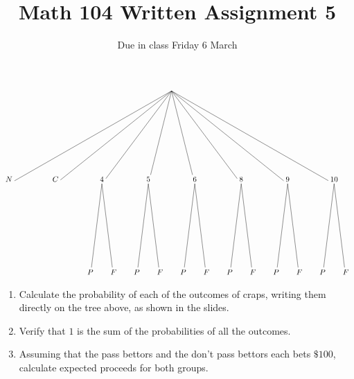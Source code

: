 \documentclass[12pt]{article}
\author{}\date{Due in class Friday 6 March}
\title{Math 104 Written Assignment 5}\author{}
\begin{document}
\maketitle
\thispagestyle{empty}
\[\begin{xy}<.85in,0cm>:
(4.5,0)="0"; (1,-2)="N"; (2,-2)="C"; (3,-2)="4";
(4,-2)="5"; (5,-2)="6"; (6,-2)="8"; (7,-2)="9"; (8,-2)="10";
"0";"N"*+!D{N}**\dir{-};
"0";"C"*+!D{C}**\dir{-};
"0";"4"*+!D{4}**\dir{-};
"0";"5"*+!D{5}**\dir{-};
"0";"6"*+!D{6}**\dir{-};
"0";"8"*+!D{8}**\dir{-};
"0";"9"*+!D{9}**\dir{-};
"0";"10"*+!D{10}**\dir{-};
"4";(2.75,-4)*+!D{P}**\dir{-};
"4";(3.25,-4)*+!D{F}**\dir{-};
"5";(3.75,-4)*+!D{P}**\dir{-};
"5";(4.25,-4)*+!D{F}**\dir{-};
"6";(4.75,-4)*+!D{P}**\dir{-};
"6";(5.25,-4)*+!D{F}**\dir{-};
"8";(5.75,-4)*+!D{P}**\dir{-};
"8";(6.25,-4)*+!D{F}**\dir{-};
"9";(6.75,-4)*+!D{P}**\dir{-};
"9";(7.25,-4)*+!D{F}**\dir{-};
"10";(7.75,-4)*+!D{P}**\dir{-};
"10";(8.25,-4)*+!D{F}**\dir{-};
\end{xy}\]

\bigskip
\begin{enumerate}
\item Calculate the probability of each of the outcomes
of craps, writing them directly on the tree above,
as shown in the slides.
\item Verify that $1$ is the sum of the probabilities
of all the outcomes.
\vspace{1in}
\item Assuming that the pass bettors and the
don't pass bettors each bets $\$100$,
calculate expected proceeds for both groups.
\end{enumerate}
\end{document}
